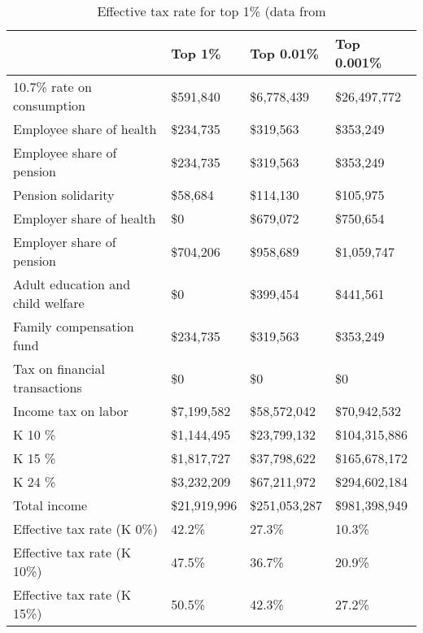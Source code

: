 \documentclass[12pt]{article}
\begin{document}
\begin{table}[]
\caption{Effective tax rate for top 1\% (data from \citet{juliana}}
\label{tab:ttop}
\footnotesize
\begin{tabular}{llll} \hline
&Top 1\%                           & Top 0.01\%  & Top 0.001\%                  \\ \hline
10.7\% rate on consumption        & \$591,840                    & \$6,778,439   & \$26,497,772  \\
Employee share of health          & \$234,735                    & \$319,563     & \$353,249     \\
Employee share of pension         & \$234,735                    & \$319,563     & \$353,249     \\
Pension solidarity                & \$58,684                     & \$114,130     & \$105,975     \\
Employer share of health          & \$0                          & \$679,072     & \$750,654     \\
Employer share of pension         & \$704,206                    & \$958,689     & \$1,059,747   \\
Adult education and child welfare & \$0                          & \$399,454     & \$441,561     \\
Family compensation fund          & \$234,735                    & \$319,563     & \$353,249     \\
Tax on financial transactions     & \$0                          & \$0           & \$0           \\
Income tax on labor               & \$7,199,582                  & \$58,572,042  & \$70,942,532  \\
K 10 \%                           & \$1,144,495                  & \$23,799,132  & \$104,315,886 \\
K 15 \%                           & \$1,817,727                  & \$37,798,622  & \$165,678,172 \\
K 24 \%                           & \$3,232,209                  & \$67,211,972  & \$294,602,184 \\
Total income                      & \$21,919,996                 & \$251,053,287 & \$981,398,949 \\
Effective tax rate (K 0\%)        & 42.2\%                       & 27.3\%        & 10.3\%        \\
Effective tax rate (K 10\%)       & 47.5\%                       & 36.7\%        & 20.9\%        \\
Effective tax rate (K 15\%)       & 50.5\%                       & 42.3\%        & 27.2\%        \\

\end{tabular}
\end{table}
\end{document}
